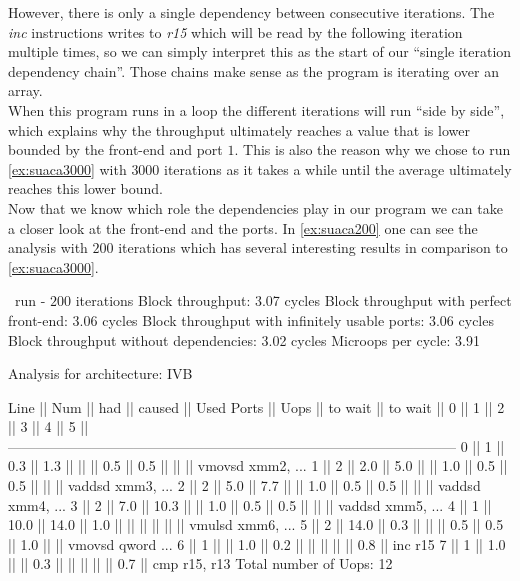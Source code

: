 However, there is only a single dependency between consecutive iterations. The \emph{inc} instructions writes to \emph{r15} which will be read by the following iteration multiple times, so we can simply interpret this as the start of our ``single iteration dependency chain''. Those chains make sense as the program is iterating over an array.\\
When this program runs in a loop the different iterations will run ``side by side'', which explains why the throughput ultimately reaches a value that is lower bounded by the front-end and port $1$. This is also the reason why we chose to run \autoref{ex:suaca3000} with $3000$ iterations as it takes a while until the average ultimately reaches this lower bound.\\
Now that we know which role the dependencies play in our program we can take a closer look at the front-end and the ports. In \autoref{ex:suaca200} one can see the analysis with $200$ iterations which has several interesting results in comparison to \autoref{ex:suaca3000}.


\begin{LabeledExample}{\suaca\ run - $200$ iterations}{\label{ex:suaca200}}
    Block throughput: 3.07 cycles
    Block throughput with perfect front-end: 3.06 cycles
    Block throughput with infinitely usable ports: 3.06 cycles
    Block throughput without dependencies: 3.02 cycles
    Microops per cycle: 3.91
    
    Analysis for architecture: IVB
    
     Line  ||   Num   ||   had   || caused  ||            Used Ports
           ||   Uops  || to wait || to wait ||   0   ||   1   ||   2   ||   3   ||   4   ||   5   ||
     ------------------------------------------------------------------------------------------------
       0   ||    1    ||   0.3   ||   1.3   ||       ||       ||  0.5  ||  0.5  ||       ||       || vmovsd xmm2, ...
       1   ||    2    ||   2.0   ||   5.0   ||       ||  1.0  ||  0.5  ||  0.5  ||       ||       || vaddsd xmm3, ...
       2   ||    2    ||   5.0   ||   7.7   ||       ||  1.0  ||  0.5  ||  0.5  ||       ||       || vaddsd xmm4, ...
       3   ||    2    ||   7.0   ||  10.3   ||       ||  1.0  ||  0.5  ||  0.5  ||       ||       || vaddsd xmm5, ...
       4   ||    1    ||  10.0   ||  14.0   ||  1.0  ||       ||       ||       ||       ||       || vmulsd xmm6, ...
       5   ||    2    ||  14.0   ||   0.3   ||       ||       ||  0.5  ||  0.5  ||  1.0  ||       || vmovsd qword ...
       6   ||    1    ||         ||   1.0   ||  0.2  ||       ||       ||       ||       ||  0.8  || inc r15
       7   ||    1    ||   1.0   ||         ||  0.3  ||       ||       ||       ||       ||  0.7  || cmp r15, r13
    Total number of Uops: 12
\end{LabeledExample}

